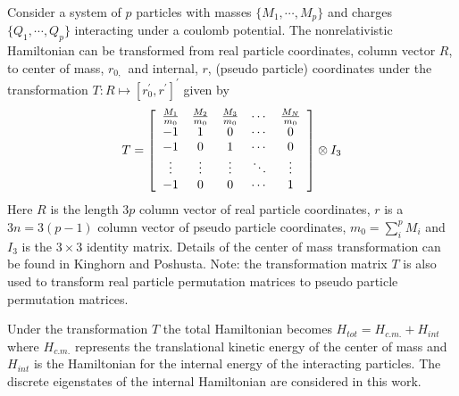 \documentclass[12pt,thmsa]{article}
\begin{document}
Consider a system of $p$ particles with masses $\{M_1,\cdots ,M_p\}$ and
charges $\{Q_1,\cdots ,Q_p\}$ interacting under a coulomb potential. The
nonrelativistic Hamiltonian can be transformed from real particle
coordinates, column vector $R$, to center of mass, $r_{0\text{, }}$ and
internal, $r$, (pseudo particle) coordinates under the transformation $%
T:R\mapsto [r_0^{\prime },r^{\prime }]^{\prime }$ given by 
\begin{equation}
T=\left[ 
\begin{array}{ccccc}
\frac{M_1}{m_0} & \frac{M_2}{m_0} & \frac{M_3}{m_0} & \cdots  & \frac{M_N}{%
m_0} \\ 
-1 & 1 & 0 & \cdots  & 0 \\ 
-1 & 0 & 1 & \cdots  & 0 \\ 
\vdots  & \vdots  & \vdots  & \ddots  & \vdots  \\ 
-1 & 0 & 0 & \cdots  & 1
\end{array}
\right] \otimes I_3  \label{tranT}
\end{equation}
Here $R$ is the length $3p$ column vector of real particle coordinates, $r$
is a $3n=3\left( p-1\right) $ column vector of pseudo particle coordinates, $%
m_0=\sum_i^pM_i$ and $I_3$ is the $3\times 3$ identity matrix. Details of
the center of mass transformation can be found in Kinghorn and Poshusta\cite
{Kinghorn93}. Note: the transformation matrix $T$ is also used to transform
real particle permutation matrices to pseudo particle permutation matrices.

Under the transformation $T$ the total Hamiltonian becomes $%
H_{tot}=H_{c.m.}+H_{int}$ where $H_{c.m.}$ represents the translational
kinetic energy of the center of mass and $H_{int}$ is the Hamiltonian for
the internal energy of the interacting particles. The discrete eigenstates
of the internal Hamiltonian are considered in this work.
\end{document}

